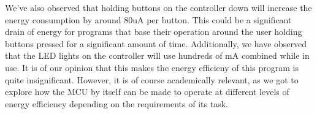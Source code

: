 We've also observed that holding buttons on the controller down will increase
the energy consumption by around 80uA per button. This could be a significant
drain of energy for programs that base their operation around the user holding
buttons pressed for a significant amount of time. Additionally, we have observed
that the LED lights on the controller will use hundreds of mA combined while in
use. It is of our opinion that this makes the energy efficieny of this program
is quite insignificant. However, it is of course academically relevant, as we
got to explore how the MCU by itself can be made to operate at different levels
of energy efficiency depending on the requirements of its task.
